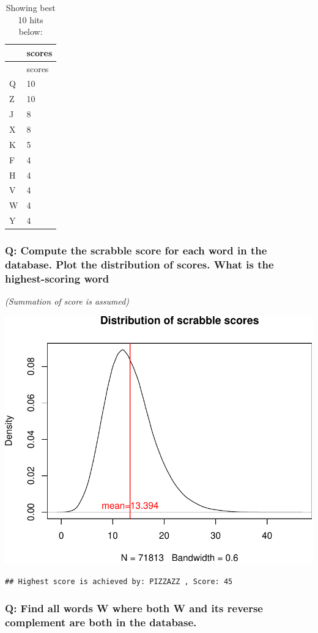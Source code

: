\documentclass[a4paperpaper,]{article}
\begin{document}
\begin{longtable}[]{@{}ll@{}}
\caption{Showing best 10 hits below:}\tabularnewline
\toprule
& scores\tabularnewline
\midrule
\endfirsthead
\toprule
& scores\tabularnewline
\midrule
\endhead
Q & 10\tabularnewline
Z & 10\tabularnewline
J & 8\tabularnewline
X & 8\tabularnewline
K & 5\tabularnewline
F & 4\tabularnewline
H & 4\tabularnewline
V & 4\tabularnewline
W & 4\tabularnewline
Y & 4\tabularnewline
\bottomrule
\end{longtable}

\subsubsection{Q: Compute the scrabble score for each word in the
database. Plot the distribution of scores. What is the highest-scoring
word}\label{q-compute-the-scrabble-score-for-each-word-in-the-database.-plot-the-distribution-of-scores.-what-is-the-highest-scoring-word}

\emph{(Summation of score is assumed)}

\includegraphics{index_files/figure-latex/word6-1.pdf}

\begin{verbatim}
## Highest score is achieved by: PIZZAZZ , Score: 45
\end{verbatim}

\subsubsection{Q: Find all words W where both W and its reverse
complement are both in the
database.}\label{q-find-all-words-w-where-both-w-and-its-reverse-complement-are-both-in-the-database.}
\end{document}
